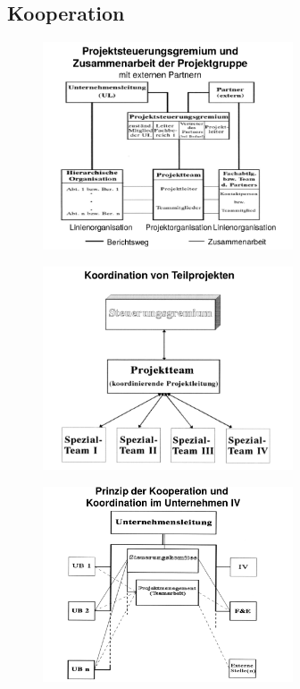 \documentclass[11pt,a4paper]{article}
\begin{document}
\subsection{Kooperation}

\begin{figure}[H]
	\centering

	\includegraphics[width=0.66\textwidth]{ch4/projektgruppe}

\end{figure}	

\begin{figure}[H]
	\centering

	\includegraphics[width=0.66\textwidth]{ch4/teilprojekt}

\end{figure}	

\begin{figure}[H]
	\centering

	\includegraphics[width=0.66\textwidth]{ch4/kooperation}

\end{figure}	
\end{document}
